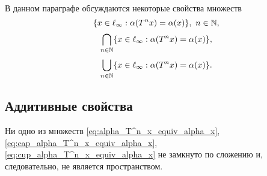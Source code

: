 В данном параграфе обсуждаются некоторые свойства множеств
\begin{equation}
	\label{eq:alpha_T^n_x_equiv_alpha_x}
	\{x \in \ell_\infty : \alpha(T^n x) = \alpha(x) \}, ~n\in\N,
\end{equation}
\begin{equation}
	\label{eq:cap_alpha_T^n_x_equiv_alpha_x}
	\bigcap\limits_{n\in\N}\{x \in \ell_\infty : \alpha(T^n x) = \alpha(x) \}
	,
\end{equation}
\begin{equation}
	\label{eq:cup_alpha_T^n_x_equiv_alpha_x}
	\bigcup_{n\in\N}\{x \in \ell_\infty : \alpha(T^n x) = \alpha(x) \}
	.
\end{equation}

\subsection{Аддитивные свойства}

\begin{theorem}
	Ни одно из множеств
	\eqref{eq:alpha_T^n_x_equiv_alpha_x}, \eqref{eq:cap_alpha_T^n_x_equiv_alpha_x}, \eqref{eq:cup_alpha_T^n_x_equiv_alpha_x}
	не замкнуто по сложению и, следовательно, не является пространством.
\end{theorem}

